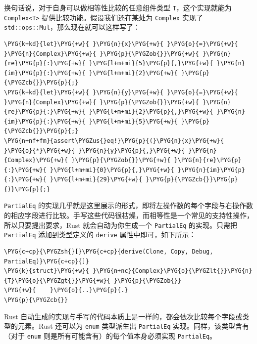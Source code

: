 换句话说，对于自身可以做相等性比较的任意组件类型 \texttt{T}，这个实现就能为 \texttt{Complex<T>} 提供比较功能。假设我们还在某处为 \texttt{Complex} 实现了 \texttt{std::ops::Mul}，那么现在就可以这样写了：

\begin{Verbatim}[commandchars=\\\{\},breaklines=true,breakanywhere=true,fontsize=\codefont,xleftmargin=17bp]
\PYG{k+kd}{let}\PYG{+w}{ }\PYG{n}{x}\PYG{+w}{ }\PYG{o}{=}\PYG{+w}{ }\PYG{n}{Complex}\PYG{+w}{ }\PYG{p}{\PYGZob{}}\PYG{+w}{ }\PYG{n}{re}\PYG{p}{:}\PYG{+w}{ }\PYG{l+m+mi}{5}\PYG{p}{,}\PYG{+w}{ }\PYG{n}{im}\PYG{p}{:}\PYG{+w}{ }\PYG{l+m+mi}{2}\PYG{+w}{ }\PYG{p}{\PYGZcb{}}\PYG{p}{;}
\PYG{k+kd}{let}\PYG{+w}{ }\PYG{n}{y}\PYG{+w}{ }\PYG{o}{=}\PYG{+w}{ }\PYG{n}{Complex}\PYG{+w}{ }\PYG{p}{\PYGZob{}}\PYG{+w}{ }\PYG{n}{re}\PYG{p}{:}\PYG{+w}{ }\PYG{l+m+mi}{2}\PYG{p}{,}\PYG{+w}{ }\PYG{n}{im}\PYG{p}{:}\PYG{+w}{ }\PYG{l+m+mi}{5}\PYG{+w}{ }\PYG{p}{\PYGZcb{}}\PYG{p}{;}
\PYG{n+nf+fm}{assert\PYGZus{}eq!}\PYG{p}{(}\PYG{n}{x}\PYG{+w}{ }\PYG{o}{*}\PYG{+w}{ }\PYG{n}{y}\PYG{p}{,}\PYG{+w}{ }\PYG{n}{Complex}\PYG{+w}{ }\PYG{p}{\PYGZob{}}\PYG{+w}{ }\PYG{n}{re}\PYG{p}{:}\PYG{+w}{ }\PYG{l+m+mi}{0}\PYG{p}{,}\PYG{+w}{ }\PYG{n}{im}\PYG{p}{:}\PYG{+w}{ }\PYG{l+m+mi}{29}\PYG{+w}{ }\PYG{p}{\PYGZcb{}}\PYG{p}{)}\PYG{p}{;}
\end{Verbatim}

\texttt{PartialEq} 的实现几乎就是这里展示的形式，即将左操作数的每个字段与右操作数的相应字段进行比较。手写这些代码很枯燥，而相等性是一个常见的支持性操作，所以只要提出要求，Rust 就会自动为你生成一个 \texttt{PartialEq} 的实现。只需把 \texttt{PartialEq} 添加到类型定义的 \texttt{derive} 属性中即可，如下所示：

\begin{Verbatim}[commandchars=\\\{\},breaklines=true,breakanywhere=true,fontsize=\codefont,xleftmargin=17bp]
\PYG{c+cp}{\PYGZsh{}[}\PYG{c+cp}{derive(Clone, Copy, Debug, PartialEq)}\PYG{c+cp}{]}
\PYG{k}{struct}\PYG{+w}{ }\PYG{n+nc}{Complex}\PYG{o}{\PYGZlt{}}\PYG{n}{T}\PYG{o}{\PYGZgt{}}\PYG{+w}{ }\PYG{p}{\PYGZob{}}
\PYG{+w}{    }\PYG{o}{..}\PYG{p}{.}
\PYG{p}{\PYGZcb{}}
\end{Verbatim}

Rust 自动生成的实现与手写的代码本质上是一样的，都会依次比较每个字段或类型的元素。Rust 还可以为 \texttt{enum} 类型派生出 \texttt{PartialEq} 实现。同样，该类型含有（对于 \texttt{enum} 则是所有可能含有）的每个值本身必须实现 \texttt{PartialEq}。

